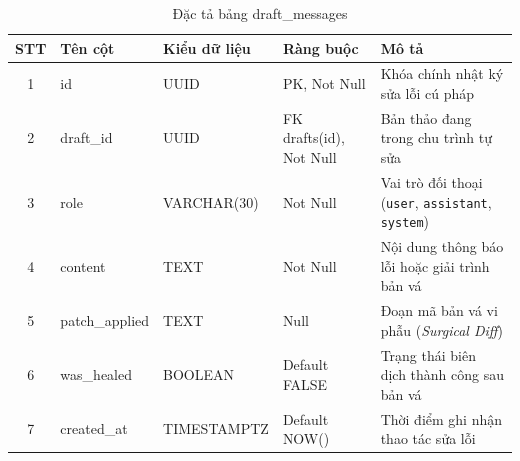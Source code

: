 \begin{table}[H]
\centering
\singlespacing
\fontsize{9pt}{11.5pt}\selectfont
\caption{Đặc tả bảng draft\_messages}
\label{tab:app_draft_messages}
\renewcommand{\arraystretch}{0.65}
\begin{tabularx}{\textwidth}{|c|>{\raggedright\arraybackslash}p{3.2cm}|>{\raggedright\arraybackslash}p{2.6cm}|>{\raggedright\arraybackslash}p{3.0cm}|>{\raggedright\arraybackslash}X|}
\hline
\textbf{STT} & \centering\textbf{Tên cột} & \centering\textbf{Kiểu dữ liệu} & \centering\textbf{Ràng buộc} & \centering\textbf{Mô tả} \tabularnewline \hline
1 & id & UUID & PK, Not Null & Khóa chính nhật ký sửa lỗi cú pháp \tabularnewline \hline
2 & draft\_id & UUID & FK drafts(id), Not Null & Bản thảo đang trong chu trình tự sửa \tabularnewline \hline
3 & role & VARCHAR(30) & Not Null & Vai trò đối thoại (\texttt{user}, \texttt{assistant}, \texttt{system}) \tabularnewline \hline
4 & content & TEXT & Not Null & Nội dung thông báo lỗi hoặc giải trình bản vá \tabularnewline \hline
5 & patch\_applied & TEXT & Null & Đoạn mã bản vá vi phẫu (\textit{Surgical Diff}) \tabularnewline \hline
6 & was\_healed & BOOLEAN & Default FALSE & Trạng thái biên dịch thành công sau bản vá \tabularnewline \hline
7 & created\_at & TIMESTAMPTZ & Default NOW() & Thời điểm ghi nhận thao tác sửa lỗi \tabularnewline \hline
\end{tabularx}
\end{table}

